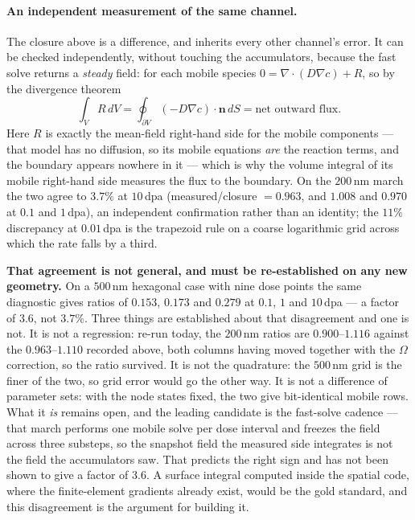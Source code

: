 \documentclass{article}
\begin{document}
\paragraph{An independent measurement of the same channel.} The closure above is
a difference, and inherits every other channel's error. It can be checked
independently, without touching the accumulators, because the fast solve returns
a \emph{steady} field: for each mobile species $0=\nabla\!\cdot\!(D\nabla c)+R$,
so by the divergence theorem
\begin{equation}
  \int_V R\,dV=\oint_{\partial V}(-D\nabla c)\!\cdot\!\bm n\,dS
   = \text{net outward flux}.
  \label{eq:divthm}
\end{equation}
Here $R$ is exactly the mean-field right-hand side for the mobile components ---
that model has no diffusion, so its mobile equations \emph{are} the reaction
terms, and the boundary appears nowhere in it --- which is why the volume integral
of its mobile right-hand side measures the flux to the boundary. On the $200\,$nm
march the two agree to $3.7\%$ at $10\,$dpa (measured/closure $=0.963$, and
$1.008$ and $0.970$ at $0.1$ and $1\,$dpa), an independent confirmation rather
than an identity; the $11\%$ discrepancy at $0.01\,$dpa is the trapezoid rule on
a coarse logarithmic grid across which the rate falls by a third.

\textbf{That agreement is not general, and must be re-established on any new
geometry.} On a $500\,$nm hexagonal case with nine dose points the same
diagnostic gives ratios of $0.153$, $0.173$ and $0.279$ at $0.1$, $1$ and
$10\,$dpa --- a factor of $3.6$, not $3.7\%$. Three things are established about
that disagreement and one is not. It is not a regression: re-run today, the
$200\,$nm ratios are $0.900$--$1.116$ against the $0.963$--$1.110$ recorded
above, both columns having moved together with the $\Omega$ correction, so the
ratio survived. It is not the quadrature: the $500\,$nm grid is the finer of the
two, so grid error would go the other way. It is not a difference of parameter
sets: with the node states fixed, the two give bit-identical mobile rows. What it
\emph{is} remains open, and the leading candidate is the fast-solve cadence ---
that march performs one mobile solve per dose interval and freezes the field
across three substeps, so the snapshot field the measured side integrates is not
the field the accumulators saw. That predicts the right sign and has not been
shown to give a factor of $3.6$. A surface integral computed inside the spatial
code, where the finite-element gradients already exist, would be the gold
standard, and this disagreement is the argument for building it.
\end{document}
